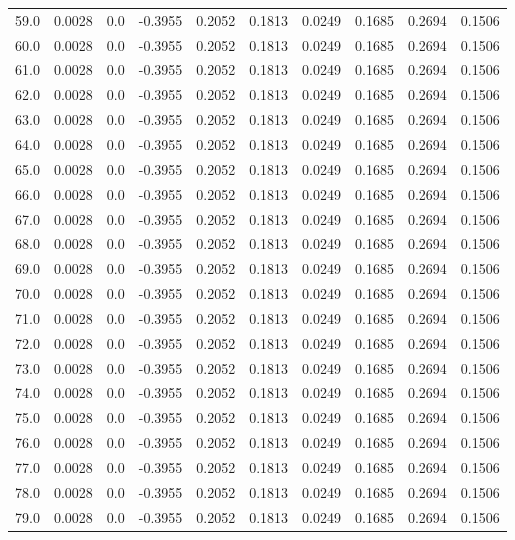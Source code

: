 \begin{longtable}{lrrrrrrrrr}
59.0 & 0.0028 & 0.0 & -0.3955 & 0.2052 & 0.1813 & 0.0249 & 0.1685 & 0.2694 & 0.1506 \\
60.0 & 0.0028 & 0.0 & -0.3955 & 0.2052 & 0.1813 & 0.0249 & 0.1685 & 0.2694 & 0.1506 \\
61.0 & 0.0028 & 0.0 & -0.3955 & 0.2052 & 0.1813 & 0.0249 & 0.1685 & 0.2694 & 0.1506 \\
62.0 & 0.0028 & 0.0 & -0.3955 & 0.2052 & 0.1813 & 0.0249 & 0.1685 & 0.2694 & 0.1506 \\
63.0 & 0.0028 & 0.0 & -0.3955 & 0.2052 & 0.1813 & 0.0249 & 0.1685 & 0.2694 & 0.1506 \\
64.0 & 0.0028 & 0.0 & -0.3955 & 0.2052 & 0.1813 & 0.0249 & 0.1685 & 0.2694 & 0.1506 \\
65.0 & 0.0028 & 0.0 & -0.3955 & 0.2052 & 0.1813 & 0.0249 & 0.1685 & 0.2694 & 0.1506 \\
66.0 & 0.0028 & 0.0 & -0.3955 & 0.2052 & 0.1813 & 0.0249 & 0.1685 & 0.2694 & 0.1506 \\
67.0 & 0.0028 & 0.0 & -0.3955 & 0.2052 & 0.1813 & 0.0249 & 0.1685 & 0.2694 & 0.1506 \\
68.0 & 0.0028 & 0.0 & -0.3955 & 0.2052 & 0.1813 & 0.0249 & 0.1685 & 0.2694 & 0.1506 \\
69.0 & 0.0028 & 0.0 & -0.3955 & 0.2052 & 0.1813 & 0.0249 & 0.1685 & 0.2694 & 0.1506 \\
70.0 & 0.0028 & 0.0 & -0.3955 & 0.2052 & 0.1813 & 0.0249 & 0.1685 & 0.2694 & 0.1506 \\
71.0 & 0.0028 & 0.0 & -0.3955 & 0.2052 & 0.1813 & 0.0249 & 0.1685 & 0.2694 & 0.1506 \\
72.0 & 0.0028 & 0.0 & -0.3955 & 0.2052 & 0.1813 & 0.0249 & 0.1685 & 0.2694 & 0.1506 \\
73.0 & 0.0028 & 0.0 & -0.3955 & 0.2052 & 0.1813 & 0.0249 & 0.1685 & 0.2694 & 0.1506 \\
74.0 & 0.0028 & 0.0 & -0.3955 & 0.2052 & 0.1813 & 0.0249 & 0.1685 & 0.2694 & 0.1506 \\
75.0 & 0.0028 & 0.0 & -0.3955 & 0.2052 & 0.1813 & 0.0249 & 0.1685 & 0.2694 & 0.1506 \\
76.0 & 0.0028 & 0.0 & -0.3955 & 0.2052 & 0.1813 & 0.0249 & 0.1685 & 0.2694 & 0.1506 \\
77.0 & 0.0028 & 0.0 & -0.3955 & 0.2052 & 0.1813 & 0.0249 & 0.1685 & 0.2694 & 0.1506 \\
78.0 & 0.0028 & 0.0 & -0.3955 & 0.2052 & 0.1813 & 0.0249 & 0.1685 & 0.2694 & 0.1506 \\
79.0 & 0.0028 & 0.0 & -0.3955 & 0.2052 & 0.1813 & 0.0249 & 0.1685 & 0.2694 & 0.1506 \\

\end{longtable}
